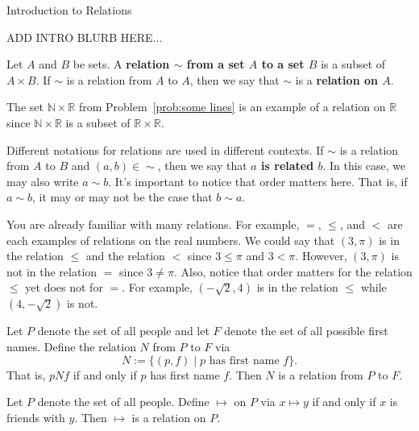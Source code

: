 \begin{section}{Introduction to Relations}

ADD INTRO BLURB HERE...

\begin{definition}
Let $A$ and $B$ be sets. A \textbf{relation $\sim$ from a set $A$ to a set $B$} is a subset of $A \times B$. If $\sim$ is a relation from $A$ to $A$, then we say that $\sim$ is a \textbf{relation on $A$}.  
\end{definition}

\begin{example}
The set $\mathbb{N}\times \mathbb{R}$ from Problem~\ref{prob:some lines} is an example of a relation on $\mathbb{R}$ since $\mathbb{N}\times \mathbb{R}$ is a subset of $\mathbb{R}\times \mathbb{R}$.
\end{example}

Different notations for relations are used in different contexts.  If $\sim$ is a relation from $A$ to $B$ and $(a,b)\in {\sim}$, then we say that \textbf{$a$ is related $b$}.  In this case, we may also write $a\sim b$.  It's important to notice that order matters here.  That is, if $a\sim b$, it may or may not be the case that $b\sim a$.

\begin{example}
You are already familiar with many relations.  For example, $=$, $\leq$, and $<$ are each examples of relations on the real numbers. We could say that $(3,\pi)$ is in the relation $\leq$ and the relation $<$ since $3\leq \pi$ and $3<\pi$.  However, $(3,\pi)$ is not in the relation $=$ since $3\neq \pi$.  Also, notice that order matters for the relation $\leq$ yet does not for $=$. For example, $(-\sqrt{2}, 4)$ is in the relation $\leq$ while $(4,-\sqrt{2})$ is not.
\end{example}

\begin{example}
Let $P$ denote the set of all people and let $F$ denote the set of all possible first names.  Define the relation $N$ from $P$ to $F$ via
\[
N:=\{(p,f)\mid p\text{ has first name }f\}.
\]
That is, $pNf$ if and only if $p$ has first name $f$.  Then $N$ is a relation from $P$ to $F$.
\end{example}

\begin{example}
Let $P$ denote the set of all people. Define $\mapsto$ on $P$ via $x\mapsto y$ if and only if $x$ is friends with $y$.  Then $\mapsto$ is a relation on $P$.
\end{example}


\end{section}
